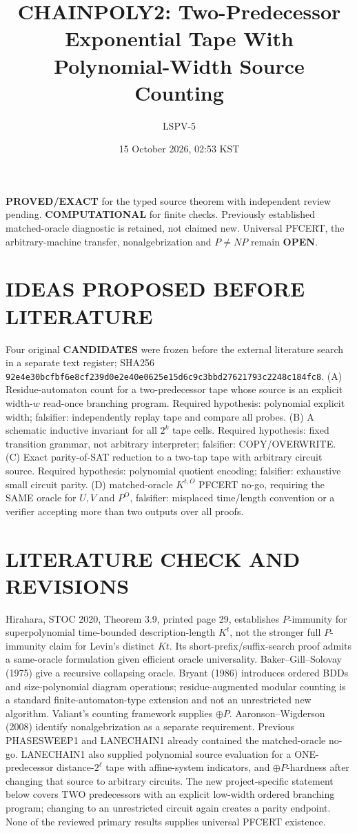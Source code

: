 \documentclass[11pt]{article}
\title{CHAINPOLY2: Two-Predecessor Exponential Tape With Polynomial-Width Source Counting}
\author{LSPV-5}
\date{15 October 2026, 02:53 KST}
\begin{document}
\maketitle
\noindent \textbf{PROVED/EXACT} for the typed source theorem with independent review pending. \textbf{COMPUTATIONAL} for finite checks. Previously established matched-oracle diagnostic is retained, not claimed new. Universal PFCERT, the arbitrary-machine transfer, nonalgebrization and $P\ne NP$ remain \textbf{OPEN}.
\section{IDEAS PROPOSED BEFORE LITERATURE}
Four original \textbf{CANDIDATES} were frozen before the external literature search in a separate text register; SHA256 \texttt{92e4e30bcfbf6e8cf239d0e2e40e0625e15d6c9c3bbd27621793c2248c184fc8}. (A) Residue-automaton count for a two-predecessor tape whose source is an explicit width-$w$ read-once branching program. Required hypothesis: polynomial explicit width; falsifier: independently replay tape and compare all probes. (B) A schematic inductive invariant for all $2^k$ tape cells. Required hypothesis: fixed transition grammar, not arbitrary interpreter; falsifier: COPY/OVERWRITE. (C) Exact parity-of-SAT reduction to a two-tap tape with arbitrary circuit source. Required hypothesis: polynomial quotient encoding; falsifier: exhaustive small circuit parity. (D) matched-oracle $K^{t,O}$ PFCERT no-go, requiring the SAME oracle for $U,V$ and $P^O$, falsifier: misplaced time/length convention or a verifier accepting more than two outputs over all proofs.
\section{LITERATURE CHECK AND REVISIONS}
Hirahara, STOC 2020, Theorem 3.9, printed page 29, establishes $P$-immunity for superpolynomial time-bounded description-length $K^t$, not the stronger full $P$-immunity claim for Levin's distinct $Kt$. Its short-prefix/suffix-search proof admits a same-oracle formulation given efficient oracle universality. Baker--Gill--Solovay (1975) give a recursive collapsing oracle. Bryant (1986) introduces ordered BDDs and size-polynomial diagram operations; residue-augmented modular counting is a standard finite-automaton-type extension and not an unrestricted new algorithm. Valiant's counting framework supplies $\oplus P$. Aaronson--Wigderson (2008) identify nonalgebrization as a separate requirement.
Previous PHASESWEEP1 and LANECHAIN1 already contained the matched-oracle no-go. LANECHAIN1 also supplied polynomial source evaluation for a ONE-predecessor distance-$2^\ell$ tape with affine-system indicators, and $\oplus P$-hardness after changing that source to arbitrary circuits. The new project-specific statement below covers TWO predecessors with an explicit low-width ordered branching program; changing to an unrestricted circuit again creates a parity endpoint. None of the reviewed primary results supplies universal PFCERT existence.
\end{document}
